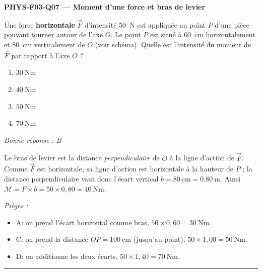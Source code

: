 \documentclass[11pt,a4paper]{article}
\newcommand{\vv}[1]{\vec{#1}}\newcommand{\ds}{\displaystyle}
\begin{document}
\noindent\textbf{PHYS-F03-Q07 --- Moment d'une force et bras de levier}\par
Une force \textbf{horizontale} $\vv F$ d'intensité \qty{50}{\newton} est appliquée au point $P$ d'une
pièce pouvant tourner autour de l'axe $O$. Le point $P$ est situé à \qty{60}{\centi\metre}
horizontalement et \qty{80}{\centi\metre} verticalement de $O$ (voir schéma). Quelle est l'intensité du
moment de $\vv F$ par rapport à l'axe $O$ ?
\begin{center}
\end{center}
\begin{enumerate}[label=\Alph*)]
\item $\qty{30}{\newton\metre}$
\item $\qty{40}{\newton\metre}$
\item $\qty{50}{\newton\metre}$
\item $\qty{70}{\newton\metre}$
\end{enumerate}
\textit{Bonne réponse : B}\par
Le bras de levier est la distance \emph{perpendiculaire} de $O$ à la ligne d'action de $\vv F$. Comme
$\vv F$ est horizontale, sa ligne d'action est horizontale à la hauteur de $P$ ; la distance
perpendiculaire vaut donc l'écart vertical $b = \qty{80}{\centi\metre} = \qty{0.80}{\metre}$. Ainsi
$\mathcal{M} = F\times b = 50\times 0{,}80 = \qty{40}{\newton\metre}$.\par
\textit{Pièges :}
\begin{itemize}
\item A: on prend l'écart horizontal comme bras, $50\times 0{,}60 = \qty{30}{\newton\metre}$.
\item C: on prend la distance $OP = \qty{100}{\centi\metre}$ (jusqu'au point), $50\times 1{,}00 = \qty{50}{\newton\metre}$.
\item D: on additionne les deux écarts, $50\times 1{,}40 = \qty{70}{\newton\metre}$.
\end{itemize}
\vspace{8pt}\hrule\vspace{8pt}
\end{document}
